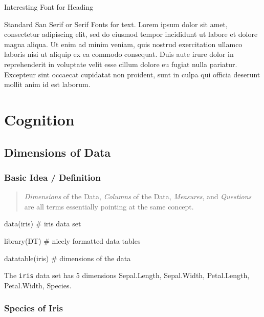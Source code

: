 \documentclass[]{article}
\newenvironment{Shaded}{}{}
\newcommand{\CommentTok}[1]{\textcolor[rgb]{0.00,0.50,0.00}{#1}}
\newcommand{\KeywordTok}[1]{\textcolor[rgb]{0.00,0.00,1.00}{#1}}
\newcommand{\NormalTok}[1]{#1}
\begin{document}
Interesting Font for Heading

Standard San Serif or Serif Fonts for text. Lorem ipsum dolor sit amet,
consectetur adipiscing elit, sed do eiusmod tempor incididunt ut labore
et dolore magna aliqua. Ut enim ad minim veniam, quis nostrud
exercitation ullamco laboris nisi ut aliquip ex ea commodo consequat.
Duis aute irure dolor in reprehenderit in voluptate velit esse cillum
dolore eu fugiat nulla pariatur. Excepteur sint occaecat cupidatat non
proident, sunt in culpa qui officia deserunt mollit anim id est laborum.

\hypertarget{cognition}{%
\section{Cognition}\label{cognition}}

\hypertarget{dimensions-of-data}{%
\subsection{Dimensions of Data}\label{dimensions-of-data}}

\hypertarget{basic-idea-definition}{%
\subsubsection{Basic Idea / Definition}\label{basic-idea-definition}}

\begin{quote}
\emph{Dimensions} of the Data, \emph{Columns} of the Data,
\emph{Measures}, and \emph{Questions} are all terms essentially pointing
at the same concept.
\end{quote}

\begin{Shaded}
\begin{Highlighting}[]
\KeywordTok{data}\NormalTok{(iris) }\CommentTok{# iris data set}

\KeywordTok{library}\NormalTok{(DT) }\CommentTok{# nicely formatted data tables}

\KeywordTok{datatable}\NormalTok{(iris) }\CommentTok{# dimensions of the data}
\end{Highlighting}
\end{Shaded}

\hypertarget{htmlwidget-4a967c2ea0ca6487f53f}{}

The \texttt{iris} data set has 5 dimensions Sepal.Length, Sepal.Width,
Petal.Length, Petal.Width, Species.

\hypertarget{species-of-iris}{%
\subsubsection{Species of Iris}\label{species-of-iris}}
\end{document}
